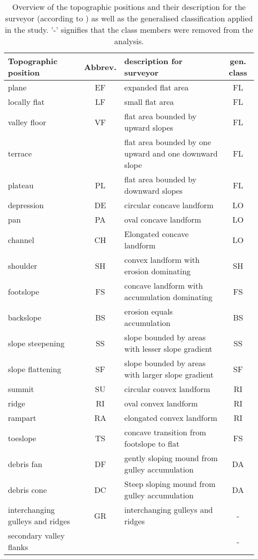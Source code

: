\documentclass[preprint,12pt,authoryear]{elsarticle}
\begin{document}
\begin{table}[!htbp]
\caption{Overview of the topographic positions and their description for the surveyor (according to \cite{Englisch1998}) as well as the generalised classification applied in the study. '-' signifies that the class members were removed from the analysis.}
\begin{center}    \begin{tabular}{  p{3cm} c p{7cm} c }
	\hline
	Topographic position & Abbrev. & description for surveyor & gen. class \\ \hline
	plane &EF& expanded flat area  & FL \\ \hline
	locally flat &LF&	small flat area  & FL \\  \hline
	valley floor &VF& flat area bounded by upward slopes  & FL \\  \hline
	\raisebox{-0ex} {terrace} &\raisebox{-0ex}{TE} & flat area bounded by one upward and one downward slope  & FL \\   \hline
	plateau &PL& flat area bounded by downward slopes  & FL \\   \hline
	depression &DE& circular concave landform & LO \\   \hline
	pan &PA& oval concave landform & LO  \\   \hline
	channel &CH& Elongated concave landform  & LO\\   \hline
	shoulder &SH& convex landform with erosion dominating & SH \\   \hline
	footslope &FS& concave landform with accumulation dominating  & FS\\   \hline
	backslope &BS& erosion equals accumulation & BS  \\   \hline
	slope steepening &SS& slope bounded by areas with lesser slope gradient  & SS \\   \hline
	slope flattening &SF& slope bounded by areas with larger slope gradient & SF \\   \hline
 	summit &SU& circular convex landform & RI \\   \hline
	ridge &RI& oval convex landform  & RI\\   \hline
	rampart &RA& elongated convex landform  & RI\\   \hline
	toeslope &TS& concave transition from footslope to flat & FS \\   \hline
	debris fan &DF& gently sloping mound from gulley accumulation & DA  \\   \hline
	debris cone &DC& Steep sloping mound from gulley accumulation  & DA\\   \hline
	interchanging gulleys and ridges &\raisebox{-1.5ex} {GR} & \raisebox {-1.5ex} {interchanging gulleys and ridges} & -  \\  \hline
	secondary valley flanks &\raisebox{-1.5ex}{SV}& \raisebox{-1.5ex}{secondary valley flanks}  & - \\   \hline
    \end{tabular}
\end{center}	
\label{table:topopositions}
\end{table}
\end{document}
